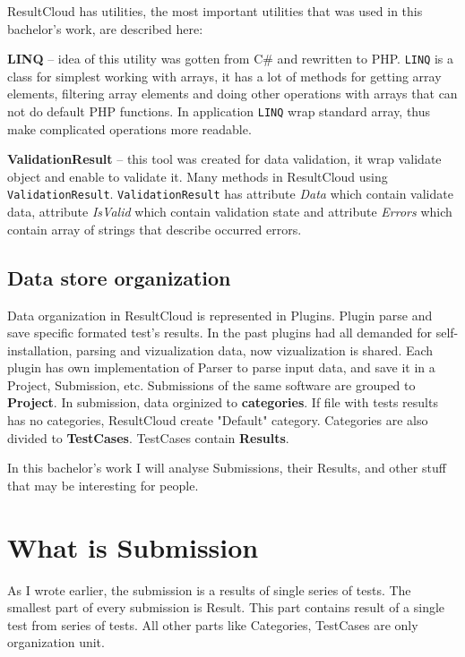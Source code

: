 ResultCloud has utilities, the most important utilities that was used in this bachelor's work, are described here:

\textbf{LINQ} -- idea of this utility was gotten from C\# and rewritten to PHP. \texttt{LINQ} is a class for simplest working with arrays, it has a lot of methods for getting array elements, filtering array elements and doing other operations with arrays that can not do default PHP functions. In application \texttt{LINQ} wrap standard array, thus make complicated operations more readable.  

\textbf{ValidationResult} -- this tool was created for data validation, it wrap validate object and enable to validate it. Many methods in ResultCloud using \texttt{ValidationResult}. \texttt{ValidationResult} has attribute \emph{Data} which contain validate data, attribute \emph{IsValid} which contain validation state and attribute \emph{Errors} which contain array of strings that describe occurred errors.

\subsection{Data store organization}

Data organization in ResultCloud is represented in Plugins. Plugin parse and save specific formated test's results. In the past plugins had all demanded for self-installation, parsing and vizualization data, now vizualization is shared. 
Each plugin has own implementation of Parser to parse input data, and save it in a Project, Submission, etc. Submissions of the same software are grouped to \textbf{Project}. In submission, data orginized to \textbf{categories}. If file with tests results has no categories, ResultCloud create "Default" category. Categories are also divided to \textbf{TestCases}. TestCases contain \textbf{Results}.

In this bachelor's work I will analyse Submissions, their Results, and other stuff that may be interesting for people.

\section{What is Submission}

As I wrote earlier, the submission is a results of single series of tests. The smallest part of every submission is Result. This part contains result of a single test from series of tests. All other parts like Categories, TestCases are only organization unit. 

